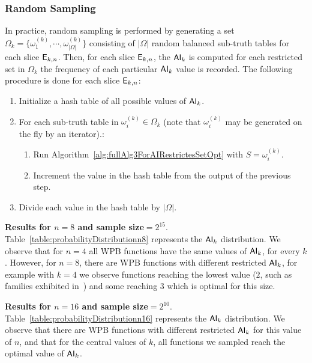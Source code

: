 \documentclass[11pt]{llncs}
\begin{document}
\subsubsection{Random Sampling}
In practice, random sampling is performed by generating a set $\Omega_k = \{\omega_1^{(k)}, \cdots, \omega_{|\Omega|}^{(k)}\}$ consisting of $|\Omega|$ random balanced sub-truth tables for each slice $\mathsf{E}_{k,n}$. 
Then, for each slice $\mathsf{E}_{k,n}$, the $\mathsf{AI}_{k}$ is computed for each restricted set in $\Omega_k$ the frequency of each particular $\mathsf{AI}_{k}$ value is recorded.
The following procedure is done for each slice $\mathsf{E}_{k,n}$:
\begin{enumerate}
    \item Initialize a hash table of all possible values of $\mathsf{AI}_{k}$.
    \item For each sub-truth table in $\omega_i^{(k)} \in \Omega_k$ (note that $\omega_i^{(k)}$ may be generated on the fly by an iterator).\footnotemark:
    \begin{enumerate}
        \item Run Algorithm~\ref{alg:fullAlg3ForAIRestrictesSetOpt} with $S=\omega_i^{(k)}$\label{enum:stepOfapplicationEnum}.
        \item Increment the value in the hash table from the output of the previous step.
    \end{enumerate}
    \item Divide each value in the hash table by $|\Omega|$.
\end{enumerate}

\noindent
\textbf{Results for $n=8$ and sample size$=2^{15}$}.
Table~\ref{table:probabilityDistributionn8} represents the $\mathsf{AI}_{k}$ distribution.
We observe that for $n=4$ all WPB functions have the same values of $\mathsf{AI}_{k}$, for every $k$. 
However, for $n=8$, there are WPB functions with different restricted $\mathsf{AI}_{k}$, for example with $k=4$ we observe functions reaching the lowest value ($2$, such as families exhibited in~\cite{Latin:GinMea23}) and some reaching $3$ which is optimal for this size.


\textbf{Results for $n=16$ and sample size$=2^{10}$}.
Table~\ref{table:probabilityDistributionn16} represents the $\mathsf{AI}_{k}$ distribution.
We observe that there are WPB functions with different restricted $\mathsf{AI}_{k}$ for this value of $n$, and that for the central values of $k$, all functions we sampled reach the optimal value of $\mathsf{AI}_{k}$.
\end{document}
